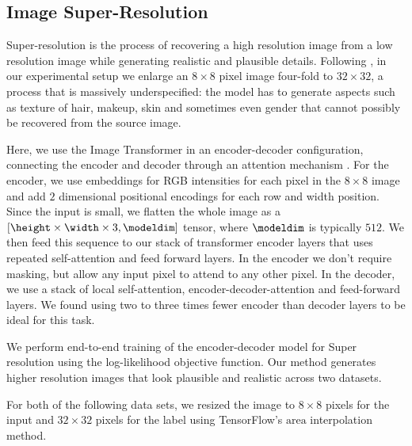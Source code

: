 


\subsection{Image Super-Resolution}\label{sec:super-res}


Super-resolution is the process of recovering a high resolution image from a low resolution image while generating realistic and plausible details. Following \citep{PixelRecursiveSuperResolution}, in our experimental setup we enlarge an $8 \times 8$ pixel image four-fold to $32 \times 32$, a process that is massively underspecified: the model has to generate aspects such as texture of hair, makeup, skin and sometimes even gender that cannot possibly be recovered from the source image.

Here, we use the Image Transformer in an encoder-decoder configuration, connecting the encoder and decoder through an attention mechanism \citep{aiayn}. For the encoder, we use embeddings for RGB intensities for each pixel in the $8 \times $8 image and add $2$ dimensional positional encodings for each row and width position. Since the input is small, we flatten the whole image as a $[\height \times \width \times 3, \modeldim]$ tensor, where $\modeldim$ is typically $512$. We then feed this sequence to our stack of transformer encoder layers that uses repeated self-attention and feed forward layers. In the encoder we don't require masking, but allow any input pixel to attend to any other pixel. In the decoder, we use a stack of local self-attention, encoder-decoder-attention and feed-forward layers. We found using two to three times fewer encoder than decoder layers to be ideal for this task.

We perform end-to-end training of the encoder-decoder model for Super resolution using the log-likelihood objective function. Our method generates higher resolution images that look plausible and realistic across two datasets.

For both of the following data sets, we resized the image to $8 \times 8$ pixels for the input and $32\times32$ pixels for the label using TensorFlow's $\mathrm{area}$ interpolation method.

